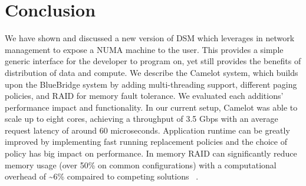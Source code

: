 \section{Conclusion}
\label{sec:conclusion}

We have shown and discussed a new version of DSM which leverages in network
management to expose a NUMA machine to the user. This provides a simple
generic interface for the developer to program on, yet still provides the
benefits of distribution of data and compute. We describe the Camelot system,
which builds upon the BlueBridge system by adding multi-threading support,
different paging policies, and RAID for memory fault tolerance. We evaluated
each additions' performance impact and functionality. In our current setup, Camelot was able to scale 
up to eight cores, achieving a throughput of 3.5 Gbps with an average request latency of around 60 
microseconds. Application runtime can be greatly improved by implementing fast running 
replacement policies and the choice of policy has big impact on performance.
In memory RAID can significantly reduce
memory usage (over 50\% on common configurations) with a computational overhead
of \textasciitilde6\% compaired to competing solutions~
\cite{Ousterhout:2015:RSS:2818727.2806887}.